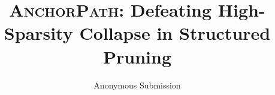 \documentclass[letterpaper]{article} %
\title{\textsc{AnchorPath}: Defeating High-Sparsity Collapse in Structured Pruning}
\author{Anonymous Submission}
\theoremstyle{plain}
\theoremstyle{definition}
\begin{document}
\maketitle

\begin{abstract}

\end{abstract}









\clearpage

\end{document}
